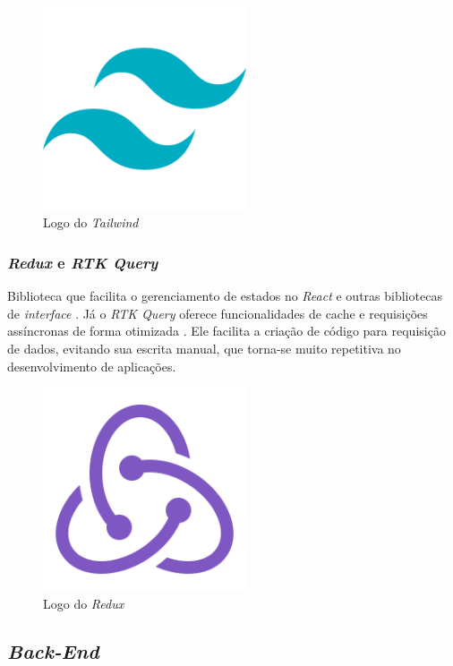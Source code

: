 \begin{figure}[htb]
	\centering
	\includegraphics[width=6cm]{cap04-desenvolvimento/images/4-4-1-2-tailwindcss-logo.png}
	\caption{Logo do \emph{Tailwind}}
	\label{fig:logo_tailwind}
\end{figure}

\subsubsection{\emph{Redux} e \emph{RTK Query}} 
Biblioteca que facilita o gerenciamento de estados no \emph{React} e outras bibliotecas de \emph{interface }\cite{redux}. Já o \emph{RTK Query} oferece funcionalidades de cache e requisições assíncronas de forma otimizada \cite{rtk-query}. Ele facilita a criação de código para requisição de dados, evitando sua escrita manual, que torna-se muito repetitiva no desenvolvimento de aplicações. 

\begin{figure}[htb]
	\centering
	\includegraphics[width=6cm]{cap04-desenvolvimento/images/4-4-1-3-redux-logo.png}
	\caption{Logo do \emph{Redux}}
	\label{fig:redux-logo}
\end{figure}

\subsection{\emph{Back-End}} 

